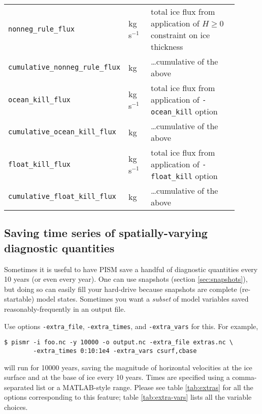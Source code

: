 \begin{table}[ht]
\begin{tabular}{p{0.4\linewidth}p{0.1\linewidth}p{0.4\linewidth}}
    \texttt{nonneg_rule_flux} & kg s$^{-1}$  & total ice flux from application of $H\ge 0$ constraint on ice thickness \\
    \texttt{cumulative_nonneg_rule_flux} & kg  & \ldots cumulative of the above \\
    \texttt{ocean_kill_flux} & kg s$^{-1}$  & total ice flux from application of \texttt{-ocean_kill} option  \\
    \texttt{cumulative_ocean_kill_flux} & kg  & \ldots cumulative of the above  \\
    \texttt{float_kill_flux} & kg s$^{-1}$  & total ice flux from application of \texttt{-float_kill} option  \\
    \texttt{cumulative_float_kill_flux} & kg  & \ldots cumulative of the above \\
    \bottomrule
  \end{tabular}
 \label{tab:time-series}
\end{table}


\subsection{Saving time series of spatially-varying diagnostic quantities}
\label{sec:saving-spat-vari}

Sometimes it is useful to have PISM save a handful of diagnostic quantities every 10 years (or even every year).  One can use snapshots (section \ref{sec:snapshots}), but doing so can easily fill your hard-drive because snapshots are complete (re-startable) model states.  Sometimes you want a \emph{subset} of model variables saved reasonably-frequently in an output file.

Use options \texttt{-extra_file}, \texttt{-extra_times}, and \texttt{-extra_vars} for this.  For example,
\begin{verbatim}
$ pismr -i foo.nc -y 10000 -o output.nc -extra_file extras.nc \
        -extra_times 0:10:1e4 -extra_vars csurf,cbase
\end{verbatim}
will run for 10000 years, saving the magnitude of horizontal velocities at the ice surface and at the base of ice every 10 years. Times are specified using a comma-separated list or a MATLAB-style range. Please see table \ref{tab:extras} for all the options corresponding to this feature; table \ref{tab:extra-vars} lists all the variable choices. 

